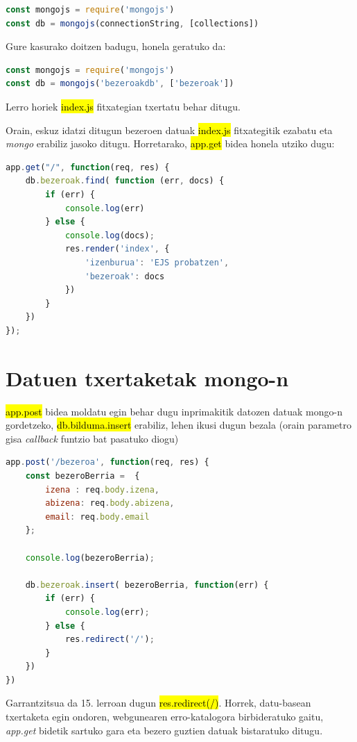 \begin{lstlisting}[language=JavaScript,numbers=none]
const mongojs = require('mongojs')
const db = mongojs(connectionString, [collections])
\end{lstlisting}

Gure kasurako doitzen badugu, honela geratuko da:

\begin{lstlisting}[language=JavaScript]
const mongojs = require('mongojs')
const db = mongojs('bezeroakdb', ['bezeroak'])
\end{lstlisting}

Lerro horiek \hl{index.js} fitxategian txertatu behar ditugu.

Orain, eskuz idatzi ditugun bezeroen datuak \hl{index.js} fitxategitik ezabatu eta \textit{mongo} erabiliz jasoko ditugu. Horretarako, \hl{app.get} bidea honela utziko dugu:

\begin{lstlisting}[language=JavaScript]
app.get("/", function(req, res) {
    db.bezeroak.find( function (err, docs) {
        if (err) {
            console.log(err)
        } else {
            console.log(docs);
            res.render('index', {
                'izenburua': 'EJS probatzen',
                'bezeroak': docs
            })
        }
    })
});
\end{lstlisting}

\section{Datuen txertaketak mongo-n}

\hl{app.post} bidea moldatu egin behar dugu  inprimakitik datozen datuak mongo-n gordetzeko, \hl{db.bilduma.insert} erabiliz, lehen ikusi dugun bezala (orain parametro gisa \textit{callback} funtzio bat pasatuko diogu)

\begin{lstlisting}[language=JavaScript]
app.post('/bezeroa', function(req, res) {
    const bezeroBerria =  {
        izena : req.body.izena,
        abizena: req.body.abizena,
        email: req.body.email
    };

    console.log(bezeroBerria);
    
    db.bezeroak.insert( bezeroBerria, function(err) {
        if (err) {
            console.log(err);
        } else {
            res.redirect('/');
        }
    })
})
\end{lstlisting}

Garrantzitsua da 15. lerroan dugun \hl{res.redirect(\textquotesingle{}/\textquotesingle{})}. Horrek, datu-basean txertaketa egin ondoren, webgunearen erro-katalogora birbideratuko gaitu, \textit{app.get} bidetik sartuko gara eta bezero guztien datuak bistaratuko ditugu.


